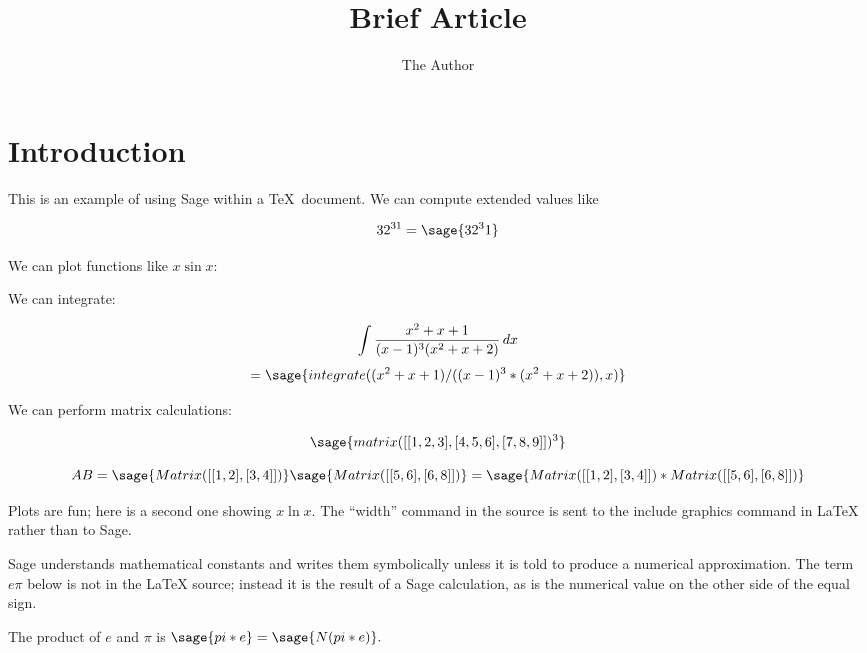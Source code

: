 \documentclass[11pt, oneside]{amsart}
\title{Brief Article}
\author{The Author}
\begin{document}
\maketitle
\section{Introduction}

This is an example of using Sage within a \TeX\ document. We can compute extended values like 

	$$32^{31} = \sage{32^31}$$
	
We can plot functions like $x \sin x$:

 
 We can integrate:
 
 $$\int {{x^2 + x + 1} \over {(x - 1)^3 (x^2 + x + 2)}}\,dx$$ $$=  \sage{integrate( (x^2 + x + 1) / ((x - 1)^3 * (x^2 + x + 2)), x )}$$
 
 \newpage
 We can perform matrix calculations:
 
$$\sage{matrix([[1, 2, 3], [4, 5, 6], [7, 8, 9]])^3}$$

$$AB=  \sage{Matrix([[1, 2], [3, 4]])} \sage{Matrix([[5, 6], [6, 8]])} = \sage{Matrix([[1, 2], [3, 4]]) * Matrix([[5, 6], [6, 8]])}$$

Plots are fun; here is a second one showing $x \ln x$. The ``width'' command in the source is sent to the include graphics command in LaTeX rather than to Sage.


Sage understands mathematical constants and writes them symbolically unless it is told to produce a numerical approximation. The term $e \pi$ below is not in the LaTeX source; instead it is the result of a Sage calculation, as is the numerical value on the other side of the equal sign.

The product of $e$ and $\pi$ is $\sage{pi * e} = \sage{N(pi * e)}.$
\end{document}
